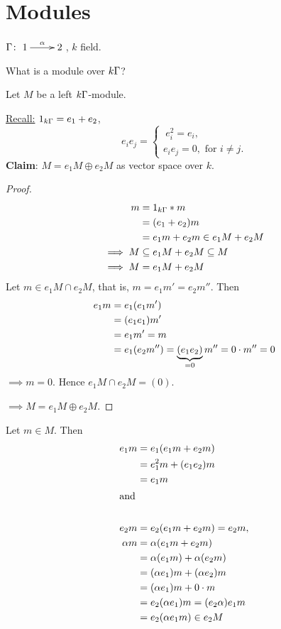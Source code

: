 \section{Modules}
\begin{exam}
$\Gamma\colon \xymatrix{1\ar[r]^\alpha & 2}$, $k$ field. 
	
What is a module over $k\Gamma$? 

Let $M$ be a left $k\Gamma$-module.
	
\underline{Recall:} 
$1_{k\Gamma}=e_1 + e_2$, 
\[e_ie_j=  \begin{cases} \ e_i^2 = e_i,\\
  e_ie_j = 0, \text{\ for $i\neq j$}.
\end{cases}\]
\textbf{Claim}: $M = e_1M\oplus e_2M$ as vector space over $k$.
\begin{proof}
  \begin{align}
    m & = 1_{k\Gamma}*m\notag\\
        & =(e_1 + e_2)m\notag\\
        & = e_1m+e_2m \in e_1M + e_2M\notag\\
\implies M & \subseteq e_1M + e_2M \subseteq M\notag\\
 \implies M & = e_1M + e_2M\notag
\end{align}
 Let  $m \in e_1M \cap e_2M$, that is, $m=e_1m'=e_2m''$. Then
\begin{align}
 e_1m & = e_1(e_1m')\notag\\
          & = (e_1e_1)m'\notag\\
          & = e_1m' = m\notag\\
          & = e_1(e_2m'')=\underbrace{(e_1e_2)}_{=0}m''=0\cdot
          m''=0\notag
\end{align}
$\implies m = 0$. Hence $e_1M \cap e_2M = (0)$.

\noindent $\implies M = e_1M \oplus e_2M$. 
\end{proof}

Let \(m\in M\).  Then 
\begin{align}
e_1m & = e_1(e_1m + e_2m)\notag\\
         & = e_1^2m + (e_1e_2)m\notag\\
         & = e_1m\notag\\
\intertext{and}\notag\\
 e_2m & = e_2(e_1m + e_2m) = e_2m\notag,\\
\alpha m & = \alpha(e_1m + e_2m)\notag\\
     & = \alpha(e_1m) + \alpha(e_2m)\notag\\
     & = (\alpha e_1)m + (\alpha e_2)m\notag\\
     & = (\alpha e_1)m + 0\cdot m\notag\\
     & = e_2(\alpha e_1) m = (e_2\alpha)e_1m\notag\\
     & = e_2(\alpha e_1 m)\in e_2M\notag
\end{align}


\end{exam}
